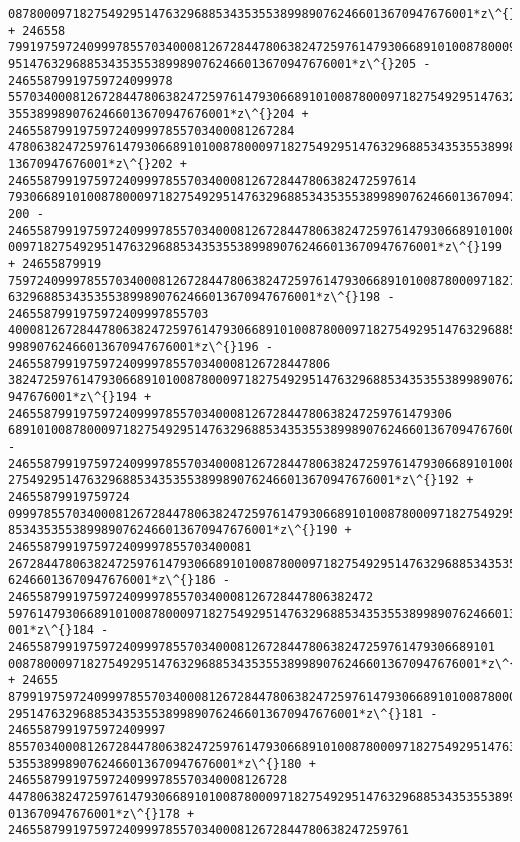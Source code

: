 \documentclass[11pt]{article}
\begin{document}
\begin{tcolorbox}[breakable, size=fbox, boxrule=.5pt, pad at break*=1mm, opacityfill=0]
\begin{Verbatim}[commandchars=\\\{\}]
08780009718275492951476329688534353553899890762466013670947676001*z\^{}206 + 246558
79919759724099978557034000812672844780638247259761479306689101008780009718275492
951476329688534353553899890762466013670947676001*z\^{}205 - 24655879919759724099978
55703400081267284478063824725976147930668910100878000971827549295147632968853435
3553899890762466013670947676001*z\^{}204 + 2465587991975972409997855703400081267284
47806382472597614793066891010087800097182754929514763296885343535538998907624660
13670947676001*z\^{}202 + 246558799197597240999785570340008126728447806382472597614
79306689101008780009718275492951476329688534353553899890762466013670947676001*z\^{}
200 - 24655879919759724099978557034000812672844780638247259761479306689101008780
009718275492951476329688534353553899890762466013670947676001*z\^{}199 + 24655879919
75972409997855703400081267284478063824725976147930668910100878000971827549295147
6329688534353553899890762466013670947676001*z\^{}198 - 2465587991975972409997855703
40008126728447806382472597614793066891010087800097182754929514763296885343535538
99890762466013670947676001*z\^{}196 - 246558799197597240999785570340008126728447806
38247259761479306689101008780009718275492951476329688534353553899890762466013670
947676001*z\^{}194 + 24655879919759724099978557034000812672844780638247259761479306
689101008780009718275492951476329688534353553899890762466013670947676001*z\^{}193 -
24655879919759724099978557034000812672844780638247259761479306689101008780009718
275492951476329688534353553899890762466013670947676001*z\^{}192 + 24655879919759724
09997855703400081267284478063824725976147930668910100878000971827549295147632968
8534353553899890762466013670947676001*z\^{}190 + 2465587991975972409997855703400081
26728447806382472597614793066891010087800097182754929514763296885343535538998907
62466013670947676001*z\^{}186 - 246558799197597240999785570340008126728447806382472
59761479306689101008780009718275492951476329688534353553899890762466013670947676
001*z\^{}184 - 24655879919759724099978557034000812672844780638247259761479306689101
008780009718275492951476329688534353553899890762466013670947676001*z\^{}182 + 24655
87991975972409997855703400081267284478063824725976147930668910100878000971827549
2951476329688534353553899890762466013670947676001*z\^{}181 - 2465587991975972409997
85570340008126728447806382472597614793066891010087800097182754929514763296885343
53553899890762466013670947676001*z\^{}180 + 246558799197597240999785570340008126728
44780638247259761479306689101008780009718275492951476329688534353553899890762466
013670947676001*z\^{}178 + 24655879919759724099978557034000812672844780638247259761

\end{Verbatim}
\end{tcolorbox}
\end{document}
